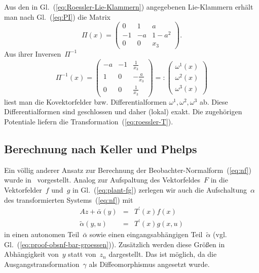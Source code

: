 \begin{example}
\label{exa:Roessler-Nam}Aus den in Gl.~(\ref{eq:Roessler-Lie-Klammern})
angegebenen Lie-Klammern erhält man nach Gl.~(\ref{eq:PI}) die Matrix
\[
\Pi(x)=\left(\begin{array}{ccc}
0 & 1 & a\\
-1 & -a & 1-a^{2}\\
0 & 0 & x_{3}
\end{array}\right).
\]
Aus ihrer Inversen~$\Pi^{-1}$ 
\[
\Pi^{-1}(x)=\left(\begin{array}{ccc}
-a & -1 & \frac{1}{x_{3}}\\
1 & 0 & -\frac{a}{x_{3}}\\
0 & 0 & \frac{1}{x_{3}}
\end{array}\right)=:\left(\begin{array}{c}
\omega^{1}(x)\\
\omega^{2}(x)\\
\omega^{3}(x)
\end{array}\right)
\]
liest man die Kovektorfelder bzw. Differentialformen $\omega^{1},\omega^{2},\omega^{3}$
ab. Diese Differentialformen sind geschlossen und daher (lokal) exakt.
Die zugehörigen Potentiale liefern die Transformation~(\ref{eq:roessler-T}).
\end{example}

\subsection{Berechnung nach Keller und Phelps\label{subsec:Berechnung-nach-Keller}}

Ein völlig anderer Ansatz zur Berechnung der Beobachter-Normalform~(\ref{eq:nf})
wurde in~\cite{keller86,keller86diss,keller87,phelps1988,phelps1991}
vorgestellt. Analog zur Aufspaltung des Vektorfeldes~$F$ in die
Vektorfelder~$f$ und~$g$ in Gl.~(\ref{eq:plant-fg}) zerlegen
wir auch die Aufschaltung~$\alpha$ des transformierten Systems~(\ref{eq:nf})
mit 
\begin{eqnarray}
Az+\bar{\alpha}(y) & = & T^{\prime}(x)f(x)\label{eq:keller-alpha-f}\\
\tilde{\alpha}(y,u) & = & T^{\prime}(x)g(x,u)\label{eq:keller-alpha-g}
\end{eqnarray}
in einen autonomen Teil~$\bar{\alpha}$ sowie einen eingangsabhängigen
Teil~$\tilde{\alpha}$ (vgl. Gl.~(\ref{eq:proof-obsnf-bar-groessen})).
Zusätzlich werden diese Größen in Abhängigkeit von~$y$ statt von~$z_{n}$
dargestellt. Das ist möglich, da die Ausgangstransformation~$\gamma$
als Diffeomorphismus angesetzt wurde.

